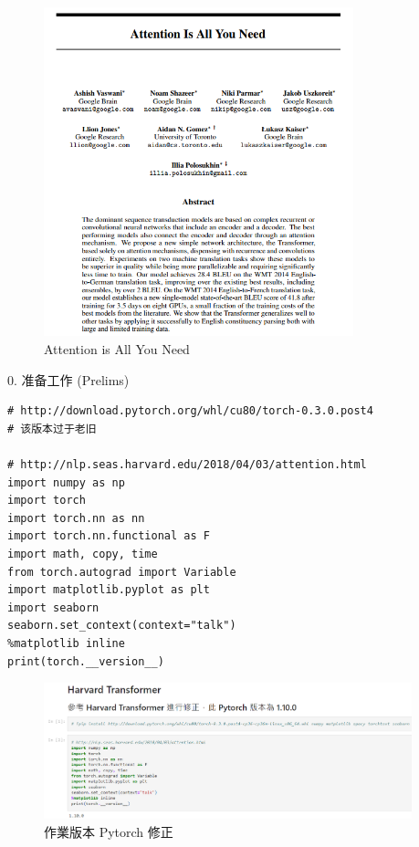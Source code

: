 \begin{figure}[htb]
\centering 
\includegraphics[width=0.8\textwidth]{img/n0.png} 
\caption{Attention is All You Need}
\label{Test}
\end{figure}

0. 准备工作 (Prelims)

\begin{Verbatim}
# http://download.pytorch.org/whl/cu80/torch-0.3.0.post4
# 该版本过于老旧

# http://nlp.seas.harvard.edu/2018/04/03/attention.html
import numpy as np
import torch
import torch.nn as nn
import torch.nn.functional as F
import math, copy, time
from torch.autograd import Variable
import matplotlib.pyplot as plt
import seaborn
seaborn.set_context(context="talk")
%matplotlib inline
print(torch.__version__)
\end{Verbatim}

\begin{figure}[htb]
\centering 
\includegraphics[width=0.95\textwidth]{img/nn0.png} 
\caption{作業版本 Pytorch 修正}
\label{Test}
\end{figure}

